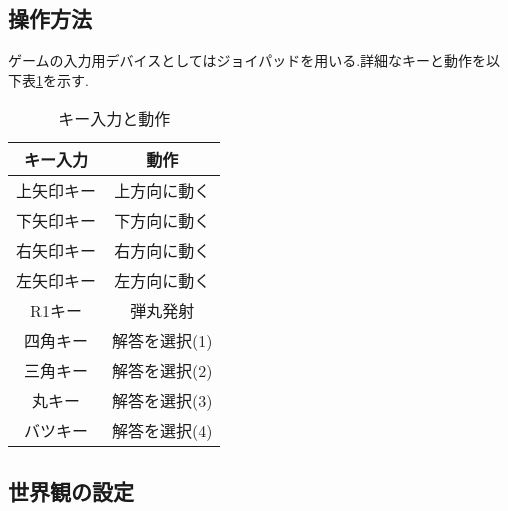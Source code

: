 \documentclass{jarticle}
\begin{document}
\subsection{操作方法}
ゲームの入力用デバイスとしてはジョイパッドを用いる.詳細なキーと動作を以下表\ref{table:inputdevice}を示す.

\begin{table}[H]
\caption{キー入力と動作}
	\begin{center}
		\begin{tabular}{|c|c|}\hline \hline
		キー入力 & 動作 \\ \hline
		上矢印キー & 上方向に動く \\ 
		下矢印キー & 下方向に動く \\ 
		右矢印キー & 右方向に動く \\ 
		左矢印キー & 左方向に動く \\ 
		R1キー　& 弾丸発射 \\
		四角キー & 解答を選択(1) \\ 
		三角キー & 解答を選択(2) \\
		丸キー　& 解答を選択(3) \\
		バツキー & 解答を選択(4) \\ \hline
		\end{tabular}
	\end{center}
\label{table:inputdevice} 
\end{table}
 
\subsection{世界観の設定}
\end{document}
